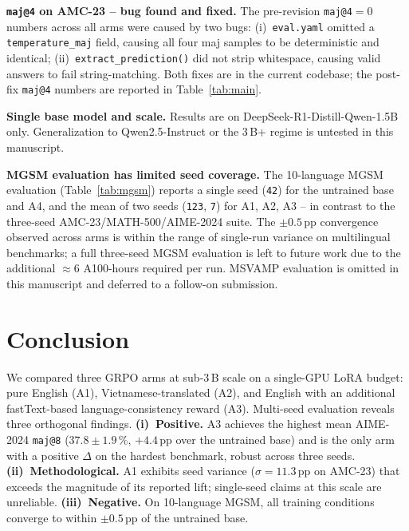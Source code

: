 \documentclass[journal,onecolumn,11pt]{IEEEtran}
\newcommand{\armA}{\textsc{A1}}
\newcommand{\armB}{\textsc{A2}}
\newcommand{\armC}{\textsc{A3}}
\newcommand{\armD}{\textsc{A4}}
\begin{document}
\textbf{\texttt{maj@4} on AMC-23 -- bug found and fixed.} The pre-revision
\texttt{maj@4}$=0$ numbers across all arms were caused by two bugs:
(i)~\texttt{eval.yaml} omitted a \texttt{temperature\_maj} field, causing
all four maj samples to be deterministic and identical;
(ii)~\texttt{extract\_prediction()} did not strip whitespace, causing valid
answers to fail string-matching. Both fixes are in the current codebase;
the post-fix \texttt{maj@4} numbers are reported in Table~\ref{tab:main}.

\textbf{Single base model and scale.} Results are on
DeepSeek-R1-Distill-Qwen-1.5B only. Generalization to Qwen2.5-Instruct or
the 3\,B+ regime is untested in this manuscript.

\textbf{MGSM evaluation has limited seed coverage.} The 10-language
MGSM evaluation (Table~\ref{tab:mgsm}) reports a single seed
(\texttt{42}) for the untrained base and \armD{}, and the mean of two
seeds (\texttt{123}, \texttt{7}) for \armA{}, \armB{}, \armC{} -- in
contrast to the three-seed AMC-23/MATH-500/AIME-2024 suite. The
$\pm 0.5$\,pp convergence observed across arms is within the range of
single-run variance on multilingual benchmarks; a full three-seed MGSM
evaluation is left to future work due to the additional $\approx 6$
A100-hours required per run. MSVAMP evaluation is omitted in this
manuscript and deferred to a follow-on submission.

\section{Conclusion}
\label{sec:conclusion}

We compared three GRPO arms at sub-3\,B scale on a single-GPU LoRA
budget: pure English (\armA{}), Vietnamese-translated (\armB{}), and
English with an additional fastText-based language-consistency reward
(\armC{}). Multi-seed evaluation reveals three orthogonal findings.
\textbf{(i)~Positive.} \armC{} achieves the highest mean AIME-2024
\texttt{maj@8} ($37.8 \pm 1.9$\,\%, $+4.4$\,pp over the untrained base)
and is the only arm with a positive $\Delta$ on the hardest benchmark,
robust across three seeds.
\textbf{(ii)~Methodological.} \armA{} exhibits seed variance
($\sigma{=}11.3$\,pp on AMC-23) that exceeds the magnitude of its
reported lift; single-seed claims at this scale are unreliable.
\textbf{(iii)~Negative.} On 10-language MGSM, all training conditions
converge to within $\pm 0.5$\,pp of the untrained base.
\end{document}
